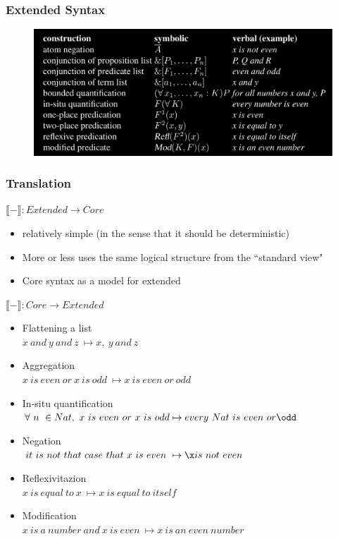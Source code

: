 \documentclass[10pt]{beamer}
\begin{document}
\begin{frame}
\frametitle{Extended Syntax}

\begin{figure}
\hspace*{-3mm}%
   \includegraphics[width= \paperwidth]{e.png}
\end{figure}
\end{frame}


\begin{frame}
\frametitle{Translation}
$\llbracket - \rrbracket : Extended \to Core$

\begin{itemize}
\item relatively simple (in the sense that it should be deterministic)
\item More or less uses the same logical structure from the ``standard view"
\item Core syntax as a model for extended
\end{itemize}

\end{frame}

\begin{frame}

$\llbracket - \rrbracket : Core \to Extended$

\begin{itemize}

\item Flattening a list \\
  $x\ and\ y\ and\ z\ \mapsto x,\ y\ and\ z$
\item Aggregation \\
  $x\ is\ even\ or\ x\ is\ odd\ \mapsto x\ is\ even\ or\ odd$
\item In-situ quantification \\
  $\forall\ n\ \in Nat,\ x\ is\ even\ or\ x\ is\ odd \mapsto every\ Nat\ is\ even\ or \odd$
\item Negation \\
  $it\ is\ not\ that\ case\ that\ x\ is\ even\ \mapsto \x is\ not\ even$
\item Reflexivitazion \\
  $x\ is\ equal\ to\ x\ \mapsto x\ is\ equal\ to\ itself$
\item Modification \\
  $x\ is\ a\ number\ and\ x\ is\ even\ \mapsto x\ is\ an\ even\ number$
\end{itemize}
\end{frame}
\end{document}
